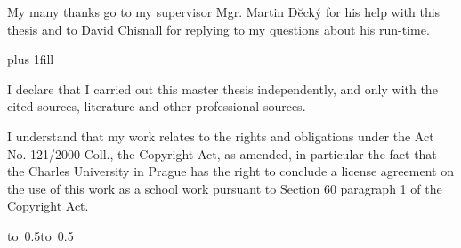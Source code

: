 \documentclass[12pt,a4paper]{report}
\let\openright=\clearpage
\begin{document}
\newpage



\openright

\noindent
My many thanks go to my supervisor Mgr. Martin D\u{e}ck\'y for his help with this thesis and to David Chisnall for replying to my questions about his run-time.

\newpage


\vglue 0pt plus 1fill

\noindent
I declare that I carried out this master thesis independently, and only with the cited
sources, literature and other professional sources.

\medskip\noindent
I understand that my work relates to the rights and obligations under the Act No.
121/2000 Coll., the Copyright Act, as amended, in particular the fact that the Charles
University in Prague has the right to conclude a license agreement on the use of this
work as a school work pursuant to Section 60 paragraph 1 of the Copyright Act.

\vspace{10mm}

\hbox{\hbox to 0.5\hbox to 0.5}

\vspace{20mm}
\newpage

\end{document}
